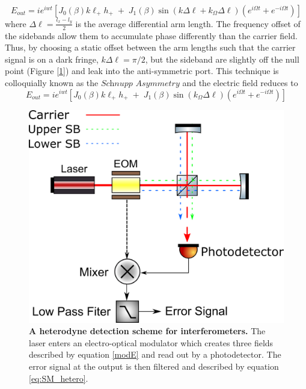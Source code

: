 		\begin{equation}
		E_{out} = i e^{iwt} [ J_0(\beta) 	k \ell_{+}  h_{+}  \; + \; J_1(\beta) \sin( k \Delta \ell + k_{\Omega} \Delta \ell) (e^{i\Omega t}  + e^{-i\Omega t}) ]
		\end{equation}
		where $\Delta \ell = \frac{l_x-l_y}{2}$ is the average differential arm length. The frequency offset of the sidebands allow them to accumulate phase differently than the carrier field. Thus, by choosing a static offset between the arm lengths such that the carrier signal is on a dark fringe, $k \Delta \ell = \pi/2$, but the sideband are slightly off the null point (Figure [\ref{fig:MichelsonHetero}]) and leak into the anti-symmetric port.  This technique is colloquially known as the $\textit{Schnupp}$ $\textit{Asymmetry}$ and the electric field reduces to
		\begin{equation}
		E_{out} = i e^{iwt} [ J_0(\beta) 	k \ell_{+}  h_{+}  \; + \; J_1(\beta) \sin(k_{\Omega} \Delta \ell) ( e^{i\Omega t} + e^{-i\Omega t}) ]
		\end{equation}
		
		\begin{figure}[h]
			\centering
			\includegraphics[width=.6 \textwidth]{../Figures/SimpleMichelsonHetero.png}
			\caption[A heterodyne detection scheme for interferometers.]  
			{\textbf{A heterodyne detection scheme for interferometers.} The laser enters an electro-optical modulator which creates three fields described by equation \ref{modE} and read out by a photodetector.  The error signal at the output is then filtered and described by equation \ref{eq:SM_hetero}.}
			\label{fig:MichelsonHetero}
		\end{figure}
		
